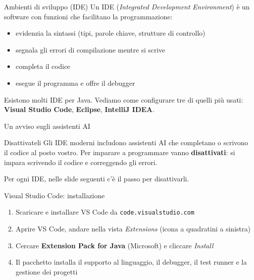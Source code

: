\documentclass[aspectratio=169,10pt,t]{beamer}
\begin{document}
\begin{frame}{Ambienti di sviluppo (IDE)}
  Un IDE (\emph{Integrated Development Environment}) \`e un software con funzioni che facilitano la programmazione:
  \begin{itemize}
    \item evidenzia la sintassi (tipi, parole chiave, strutture di controllo)
    \item segnala gli errori di compilazione mentre si scrive
    \item completa il codice
    \item esegue il programma e offre il debugger
  \end{itemize}
  \vspace{0.5em}
  Esistono molti IDE per Java. Vediamo come configurare tre di quelli pi\`u usati:
  \textbf{Visual Studio Code}, \textbf{Eclipse}, \textbf{IntelliJ IDEA}.
\end{frame}

\begin{frame}{Un avviso sugli assistenti AI}
  \begin{alertblock}{Disattivateli}
    Gli IDE moderni includono assistenti AI che completano o scrivono il codice al posto vostro.
    Per imparare a programmare vanno \textbf{disattivati}: si impara scrivendo il codice e correggendo gli errori.
  \end{alertblock}
  \vspace{0.5em}
  Per ogni IDE, nelle slide seguenti c'\`e il passo per disattivarli.
\end{frame}

\begin{frame}{Visual Studio Code: installazione}
  \begin{enumerate}
    \item Scaricare e installare VS Code da \texttt{code.visualstudio.com}
    \item Aprire VS Code, andare nella vista \emph{Extensions} (icona a quadratini a sinistra)
    \item Cercare \textbf{Extension Pack for Java} (Microsoft) e cliccare \emph{Install}
    \item Il pacchetto installa il supporto al linguaggio, il debugger, il test runner e la gestione dei progetti
  \end{enumerate}
\end{frame}
\end{document}
